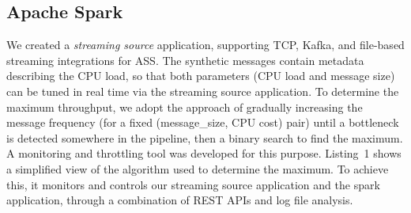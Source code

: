 \documentclass[conference]{IEEEtran}
\begin{document}
\subsection{Apache Spark}
We created a \emph{streaming source} application, supporting TCP, Kafka, and file-based streaming integrations for ASS. The synthetic messages contain metadata describing the CPU load, so that both parameters (CPU load and message size) can be tuned in real time via the streaming source application.
To determine the maximum throughput, we adopt the approach of gradually increasing the message frequency (for a fixed (message\_size, CPU cost) pair) until a bottleneck is detected somewhere in the pipeline, then a binary search to find the maximum. A monitoring and throttling tool was developed for this purpose. Listing~1 shows a simplified view of the algorithm used to determine the maximum. To achieve this, it monitors and controls our streaming source application and the spark application, through a combination of REST APIs and log file analysis. 





\end{document}
